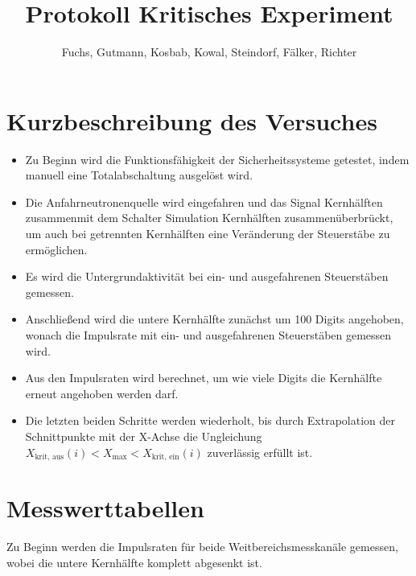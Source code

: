 \documentclass[12pt,german]{article}
\title{\vspace{-1.5cm}Protokoll Kritisches Experiment}
\author{Fuchs, Gutmann, Kosbab, Kowal, Steindorf, Fälker, Richter}
\begin{document}
    \maketitle
    \tableofcontents

    \section{Kurzbeschreibung des Versuches}
    \begin{itemize}
        \item Zu Beginn wird die Funktionsfähigkeit der Sicherheitssysteme getestet, indem manuell eine Totalabschaltung ausgelöst wird.
        \item Die Anfahrneutronenquelle wird eingefahren und das Signal \glqq Kernhälften zusammen\grqq  mit dem Schalter \glqq  Simulation Kernhälften zusammen\grqq überbrückt, um auch bei getrennten Kernhälften eine Veränderung der Steuerstäbe zu ermöglichen.
        \item Es wird die Untergrundaktivität bei ein- und ausgefahrenen Steuerstäben gemessen.
        \item Anschließend wird die untere Kernhälfte zunächst um 100 Digits angehoben, wonach die Impulsrate mit ein- und ausgefahrenen Steuerstäben gemessen wird.
        \item Aus den Impulsraten wird berechnet, um wie viele Digits die Kernhälfte erneut angehoben werden darf.
        \item Die letzten beiden Schritte werden wiederholt, bis durch Extrapolation der Schnittpunkte mit der X-Achse die Ungleichung \(X_\text{krit, aus}(i) < X_\text{max} < X_\text{krit, ein}(i)\) zuverlässig erfüllt ist.
    \end{itemize}

    \newpage

    \section{Messwerttabellen}

    Zu Beginn werden die Impulsraten für beide Weitbereichsmesskanäle gemessen, wobei die untere Kernhälfte komplett abgesenkt ist.
\end{document}
